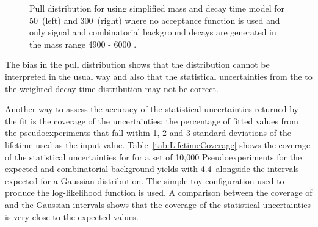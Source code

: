 \begin{figure}[htbp]
\begin{subfigure}[b]{0.48\textwidth}
   \end{subfigure}
    \caption{Pull distribution for \tmumu using simplified mass and decay time model for 50~\fb (left) and 300~\fb (right) where no acceptance function is used and only signal and combinatorial background decays are generated in the mass range 4900 - 6000 \mevcc.}
    \label{fig:morestatstaupulls}
\end{figure}


The bias in the \tmumu pull distribution shows that the distribution cannot be interpreted in the usual way and also that the statistical uncertainties from the \ml to the weighted decay time distribution may not be correct. 

Another way to assess the accuracy of the statistical uncertainties returned by the \ml fit is the coverage of the uncertainties; the percentage of fitted \tmumu values from the pseudoexperiments that fall within 1, 2 and 3 standard deviations of the lifetime used as the input value. Table~\ref{tab:LifetimeCoverage} shows the coverage of the statistical uncertainties for \tmumu for a set of 10,000 Pseudoexperiments for the expected \bsmumu and combinatorial background yields with 4.4~\fb alongside the intervals expected for a Gaussian distribution. The simple toy configuration used to produce the log-likelihood function is used. A comparison between the coverage of \tmumu and the Gaussian intervals shows that the coverage of the statistical uncertainties is very close to the expected values.

